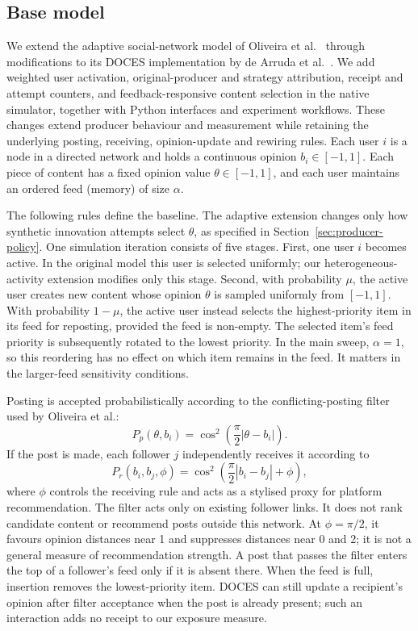 \documentclass[runningheads]{llncs}
\begin{document}
\subsection{Base model}

We extend the adaptive social-network model of Oliveira et al.~\cite{oliveira2026} through modifications to its DOCES implementation by de Arruda et al.~\cite{deArruda2025}. We add weighted user activation, original-producer and strategy attribution, receipt and attempt counters, and feedback-responsive content selection in the native simulator, together with Python interfaces and experiment workflows. These changes extend producer behaviour and measurement while retaining the underlying posting, receiving, opinion-update and rewiring rules. Each user \(i\) is a node in a directed network and holds a continuous opinion \(b_i\in[-1,1]\). Each piece of content has a fixed opinion value \(\theta\in[-1,1]\), and each user maintains an ordered feed (memory) of size \(\alpha\).

The following rules define the baseline. The adaptive extension changes only how synthetic innovation attempts select \(\theta\), as specified in Section~\ref{sec:producer-policy}. One simulation iteration consists of five stages. First, one user \(i\) becomes active. In the original model this user is selected uniformly; our heterogeneous-activity extension modifies only this stage. Second, with probability \(\mu\), the active user creates new content whose opinion \(\theta\) is sampled uniformly from \([-1,1]\). With probability \(1-\mu\), the active user instead selects the highest-priority item in its feed for reposting, provided the feed is non-empty. The selected item's feed priority is subsequently rotated to the lowest priority. In the main sweep, \(\alpha=1\), so this reordering has no effect on which item remains in the feed. It matters in the larger-feed sensitivity conditions.

Posting is accepted probabilistically according to the conflicting-posting filter used by Oliveira et al.:
\[
P_p(\theta,b_i)=
\cos^2\left(\frac{\pi}{2}|\theta-b_i|\right).
\]
If the post is made, each follower \(j\) independently receives it according to
\[
P_r(b_i,b_j,\phi)=
\cos^2\left(\frac{\pi}{2}|b_i-b_j|+\phi\right),
\]
where \(\phi\) controls the receiving rule and acts as a stylised proxy for platform recommendation. The filter acts only on existing follower links. It does not rank candidate content or recommend posts outside this network. At \(\phi=\pi/2\), it favours opinion distances near 1 and suppresses distances near 0 and 2; it is not a general measure of recommendation strength. A post that passes the filter enters the top of a follower's feed only if it is absent there. When the feed is full, insertion removes the lowest-priority item. DOCES can still update a recipient's opinion after filter acceptance when the post is already present; such an interaction adds no receipt to our exposure measure.
\end{document}
